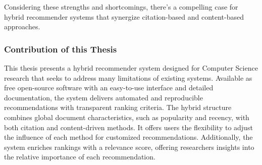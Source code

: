 Considering these strengths and shortcomings, there's a compelling case for hybrid recommender systems that synergize citation-based and content-based approaches.


\subsubsection*{Contribution of this Thesis}

This thesis presents a hybrid recommender system designed for Computer Science research that seeks to address many limitations of existing systems.
Available as free open-source software with an easy-to-use interface and detailed documentation, the system delivers automated and reproducible recommendations with transparent ranking criteria.
The hybrid structure combines global document characteristics, such as popularity and recency, with both citation and content-driven methods. It offers users the flexibility to adjust the influence of each method for customized recommendations. Additionally, the system enriches rankings with a relevance score, offering researchers insights into the relative importance of each recommendation.
